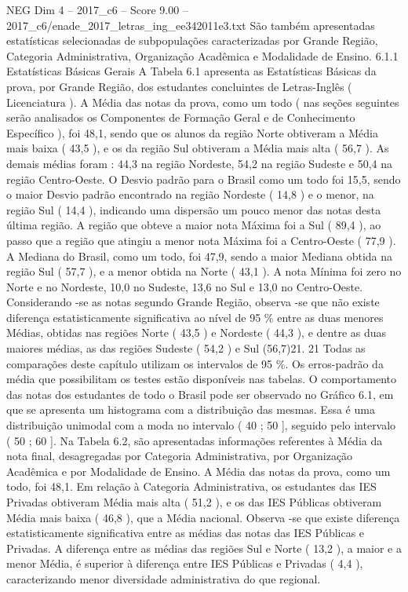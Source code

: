 \begin{textsample}{NEG Dim 4 – 2017\_c6 – Score 9.00 – 2017\_c6/enade\_2017\_letras\_ing\_ee342011e3.txt}
São também apresentadas estatísticas selecionadas de subpopulações caracterizadas por Grande Região, Categoria Administrativa, Organização Acadêmica e Modalidade de Ensino. 6.1.1 Estatísticas Básicas Gerais A Tabela 6.1 apresenta as Estatísticas Básicas da prova, por Grande Região, dos estudantes concluintes de Letras-Inglês ( Licenciatura ).
A Média das notas da prova, como um todo ( nas seções seguintes serão analisados os Componentes de Formação Geral e de Conhecimento Específico ), foi 48,1, sendo que os alunos da região Norte obtiveram a Média mais baixa ( 43,5 ), e os da região Sul obtiveram a Média mais alta ( 56,7 ).
As demais médias foram : 44,3 na região Nordeste, 54,2 na região Sudeste e 50,4 na região Centro-Oeste.
O Desvio padrão para o Brasil como um todo foi 15,5, sendo o maior Desvio padrão encontrado na região Nordeste ( 14,8 ) e o menor, na região Sul ( 14,4 ), indicando uma dispersão um pouco menor das notas desta última região.
A região que obteve a maior nota Máxima foi a Sul ( 89,4 ), ao passo que a região que atingiu a menor nota Máxima foi a Centro-Oeste ( 77,9 ).
A Mediana do Brasil, como um todo, foi 47,9, sendo a maior Mediana obtida na região Sul ( 57,7 ), e a menor obtida na Norte ( 43,1 ).
A nota Mínima foi zero no Norte e no Nordeste, 10,0 no Sudeste, 13,6 no Sul e 13,0 no Centro-Oeste.
Considerando -se as notas segundo Grande Região, observa -se que não existe diferença estatisticamente significativa ao nível de 95 \% entre as duas menores Médias, obtidas nas regiões Norte ( 43,5 ) e Nordeste ( 44,3 ), e dentre as duas maiores médias, as das regiões Sudeste ( 54,2 ) e Sul (56,7)21. 21 Todas as comparações deste capítulo utilizam os intervalos de 95 \%.
Os erros-padrão da média que possibilitam os testes estão disponíveis nas tabelas.
O comportamento das notas dos estudantes de todo o Brasil pode ser observado no Gráfico 6.1, em que se apresenta um histograma com a distribuição das mesmas.
Essa é uma distribuição unimodal com a moda no intervalo ( 40 ; 50 ], seguido pelo intervalo ( 50 ; 60 ].
Na Tabela 6.2, são apresentadas informações referentes à Média da nota final, desagregadas por Categoria Administrativa, por Organização Acadêmica e por Modalidade de Ensino.
A Média das notas da prova, como um todo, foi 48,1.
Em relação à Categoria Administrativa, os estudantes das IES Privadas obtiveram Média mais alta ( 51,2 ), e os das IES Públicas obtiveram Média mais baixa ( 46,8 ), que a Média nacional.
Observa -se que existe diferença estatisticamente significativa entre as médias das notas das IES Públicas e Privadas.
A diferença entre as médias das regiões Sul e Norte ( 13,2 ), a maior e a menor Média, é superior à diferença entre IES Públicas e Privadas ( 4,4 ), caracterizando menor diversidade administrativa do que regional.

\end{textsample}
